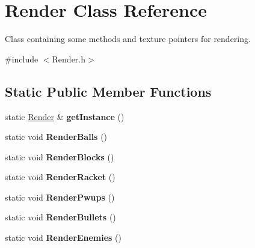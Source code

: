 \hypertarget{class_render}{}\section{Render Class Reference}
\label{class_render}


Class containing some methods and texture pointers for rendering.  




{\ttfamily \#include $<$Render.\+h$>$}

\subsection*{Static Public Member Functions}
\begin{DoxyCompactItemize}
\item 
\mbox{\label{class_render_adec8165d47785008ef1b593cd7f2866f}} 
static \hyperlink{class_render}{Render} \& {\bfseries get\+Instance} ()
\item 
\mbox{\label{class_render_aa0e41ce94983c5ead71a3a2bff83b62b}} 
static void {\bfseries Render\+Balls} ()
\item 
\mbox{\label{class_render_ab14b3c69b68bb08457d9416426a291f2}} 
static void {\bfseries Render\+Blocks} ()
\item 
\mbox{\label{class_render_a4a257b71e0f6de8639e00c61a560662d}} 
static void {\bfseries Render\+Racket} ()
\item 
\mbox{\label{class_render_a2d2dbb588a127236e25106d63e2e031d}} 
static void {\bfseries Render\+Pwups} ()
\item 
\mbox{\label{class_render_af79f3fef9fceb2615207f5b9feecf014}} 
static void {\bfseries Render\+Bullets} ()
\item 
\mbox{\label{class_render_af07aacd067217ff6ee66067a374e9397}} 
static void {\bfseries Render\+Enemies} ()
\end{DoxyCompactItemize}
